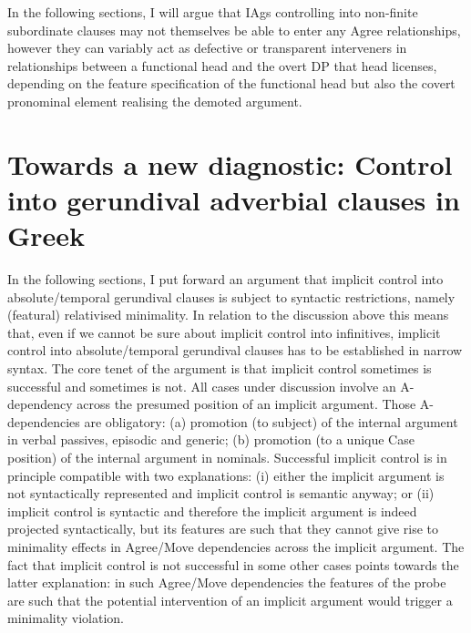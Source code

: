 \documentclass[output=paper]{langsci/langscibook}
\begin{document}
In the following sections, I will argue that \glspl{IAg} controlling into non-finite
subordinate clauses may not themselves be able to enter any Agree
relationships, however they can variably act as defective or transparent
interveners in  relationships between a functional head and the overt DP
that head licenses, depending on the feature specification of the functional
head but also the covert pronominal element realising the demoted argument.

\section{Towards a new diagnostic: Control into gerundival adverbial clauses in
Greek}\label{sec:key:22.3}

In the following sections, I put forward an argument that implicit control into
absolute/temporal gerundival clauses is subject to syntactic restrictions,
namely (featural) relativised minimality. In relation to the discussion above
this means that, even if we cannot be sure about implicit control into
infinitives, implicit control into absolute/temporal gerundival clauses has to
be established in narrow syntax. The core tenet of the argument is that
implicit control sometimes is successful and sometimes is not. All cases under
discussion involve an A-dependency across the presumed position of an implicit
argument. Those A-dependencies are obligatory: (a) promotion (to subject) of
the internal argument in verbal passives, episodic and generic; (b) promotion
(to a unique Case position) of the internal argument in  nominals.
Successful implicit control is in principle compatible with two explanations:
(i) either the implicit argument is not syntactically represented and implicit
control is semantic anyway; or (ii) implicit control is syntactic and therefore
the implicit argument is indeed projected syntactically, but its features are
such that they cannot give rise to minimality effects in Agree/Move
dependencies across the implicit argument. The fact that implicit control
is not successful in some other cases points towards the latter explanation: in
such Agree/Move dependencies the features of the probe are such that the
potential intervention of an implicit argument would trigger a minimality
violation.
\end{document}
